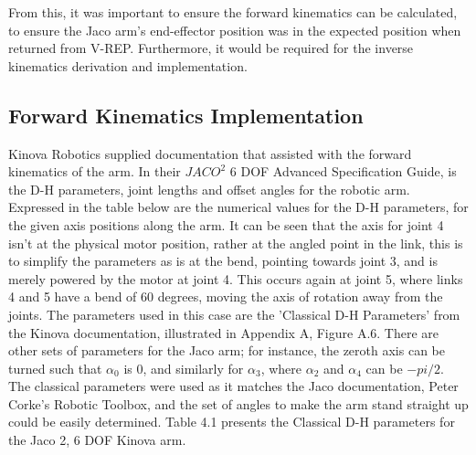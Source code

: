 \documentclass[12pt,openany,a4paper]{book}
\begin{document}
\vspace{\baselineskip}


\vspace{\baselineskip}

From this, it was important to ensure the forward kinematics can be calculated, to ensure the Jaco arm's end-effector position was in the expected position when returned from V-REP. Furthermore, it would be required for the inverse kinematics derivation and implementation. 

\subsection{Forward Kinematics Implementation}
Kinova Robotics supplied documentation that assisted with the forward kinematics of the arm. In their $JACO^2$ 6 DOF Advanced Specification Guide, is the D-H parameters, joint lengths and offset angles for the robotic arm. Expressed in the table below are the numerical values for the D-H parameters, for the given axis positions along the arm. It can be seen that the axis for joint 4 isn't at the physical motor position, rather at the angled point in the link, this is to simplify the parameters as is at the bend, pointing towards joint 3, and is merely powered by the motor at joint 4. This occurs again at joint 5, where links 4 and 5 have a bend of 60 degrees, moving the axis of rotation away from the joints. The parameters used in this case are the 'Classical D-H Parameters' from the Kinova documentation, illustrated in Appendix A, Figure A.6. There are other sets of parameters for the Jaco arm; for instance, the zeroth axis can be turned such that $\alpha_0$ is 0, and similarly for $\alpha_3$, where $\alpha_2$ and $\alpha_4$ can be $-pi/2$. The classical parameters were used as it matches the Jaco documentation, Peter Corke's Robotic Toolbox, and the set of angles to make the arm stand straight up could be easily determined. Table 4.1 presents the Classical D-H parameters for the Jaco 2, 6 DOF Kinova arm.

\vspace{\baselineskip}

\end{document}
